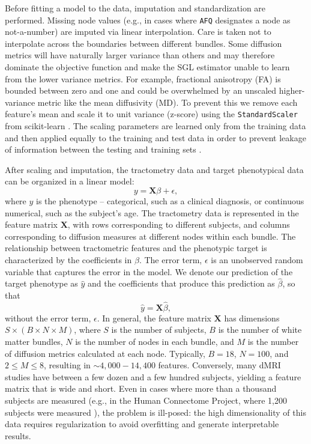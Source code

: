 \documentclass[10pt,%
               aps,%
               prl,%
               reprint,%
               superscriptaddress,%
               preprintnumbers,%
               linenumbers,%
               amsmath,%
               floatfix]{revtex4-2}
\begin{document}
Before fitting a model to the data, imputation and standardization are
performed. Missing node values (e.g., in cases where \texttt{AFQ} designates
a node as not-a-number) are imputed via linear interpolation. Care is taken
not to interpolate across the boundaries between different bundles. Some
diffusion metrics will have naturally larger variance than others and may
therefore dominate the objective function and make the SGL estimator unable
to learn from the lower variance metrics. For example, fractional anisotropy
(FA) is bounded between zero and one and could be overwhelmed by an unscaled
higher-variance metric like the mean diffusivity (MD). To prevent this we
remove each feature's mean and scale it to unit variance (z-score) using the
\lstinline{StandardScaler} from scikit-learn \cite{scikit-learn}. The scaling
parameters are learned only from the training data and then applied equally
to the training and test data in order to prevent leakage of information
between the testing and training sets \cite{kaufman2012leakage}.

After scaling and imputation, the tractometry data and target
phenotypical data can be organized in a linear model:
\begin{equation}
    y = \mathbf{X} \beta + \epsilon,
    \label{eq:lm}
\end{equation}
where $y$ is the phenotype -- categorical, such as a clinical diagnosis,
or continuous numerical, such as the subject's age. The tractometry
data is represented in the feature matrix $\mathbf{X}$, with rows
corresponding to different subjects, and columns corresponding
to diffusion measures at different nodes within each bundle. The
relationship between tractometric features and the phenotypic target is
characterized by the coefficients in $\beta$. The error term, $\epsilon$
is an unobserved random variable that captures the error in the model.
We denote our prediction of the target phenotype as $\hat{y}$ and the
coefficients that produce this prediction as $\hat{\beta}$, so that
\begin{equation}
    \hat{y} = \mathbf{X} \hat{\beta},
    \label{eq:lm-approx}
\end{equation}
without the error term, $\epsilon$. In general, the feature matrix
$\mathbf{X}$ has dimensions $S \times (B \times N \times M)$, where $S$
is the number of subjects, $B$ is the number of white matter bundles,
$N$ is the number of nodes in each bundle, and $M$ is the number of
diffusion metrics calculated at each node. Typically, $B = 18$, $N =
100$, and $2 \le M \le 8$, resulting in $\sim 4,000 - 14,400$ features.
Conversely, many dMRI studies have between a few dozen and a few
hundred subjects, yielding a feature matrix that is wide and short.
Even in cases where more than a thousand subjects are measured (e.g.,
in the Human Connectome Project, where 1,200 subjects were measured
\cite{VanEssen2012}), the problem is ill-posed: the high dimensionality
of this data requires regularization to avoid overfitting and generate
interpretable results.
\end{document}

